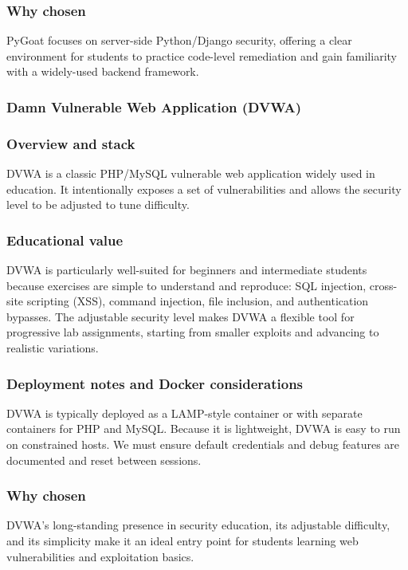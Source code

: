 \documentclass[12pt,titlepage]{article}
\begin{document}
\subsubsection*{Why chosen}
PyGoat focuses on server-side Python/Django security, offering a clear environment for students to practice code-level remediation and gain familiarity with a widely-used backend framework.


\subsubsection{Damn Vulnerable Web Application (DVWA)}
\subsubsection*{Overview and stack}
DVWA is a classic PHP/MySQL vulnerable web application widely used in education. It intentionally exposes a set of vulnerabilities and allows the security level to be adjusted to tune difficulty.

\subsubsection*{Educational value}
DVWA is particularly well-suited for beginners and intermediate students because exercises are simple to understand and reproduce: SQL injection, cross-site scripting (XSS), command injection, file inclusion, and authentication bypasses. The adjustable security level makes DVWA a flexible tool for progressive lab assignments, starting from smaller exploits and advancing to realistic variations.

\subsubsection*{Deployment notes and Docker considerations}
DVWA is typically deployed as a LAMP-style container or with separate containers for PHP and MySQL. Because it is lightweight, DVWA is easy to run on constrained hosts. We must ensure default credentials and debug features are documented and reset between sessions.

\subsubsection*{Why chosen}
DVWA’s long-standing presence in security education, its adjustable difficulty, and its simplicity make it an ideal entry point for students learning web vulnerabilities and exploitation basics.
\end{document}
